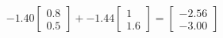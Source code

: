 \documentclass[preview]{standalone}
\begin{document}
\begin{align*}
-1.40 \begin{bmatrix} 0.8 \\ 0.5 \end{bmatrix} + -1.44 \begin{bmatrix} 1 \\ 1.6 \end{bmatrix} = \begin{bmatrix} -2.56 \\ -3.00 \end{bmatrix}
\end{align*}
\end{document}

